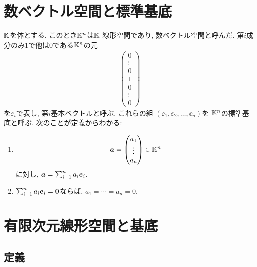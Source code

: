 \section{数ベクトル空間と標準基底}
$\mathbb{K}$を体とする.
このとき$\mathbb{K}^n$は$\mathbb{K}$-線形空間であり,
数ベクトル空間と呼んだ.
第$i$成分のみ$1$で他は$0$である$\mathbb{K}^n$の元
\begin{align*}
  \begin{pmatrix}0\\\vdots\\0\\1\\0\\\vdots\\0\end{pmatrix}
\end{align*}
を$\ee_i$で表し,
第$i$基本ベクトルと呼ぶ.
これらの組 $(\ee_1,\ee_2,\ldots,\ee_n)$を
$\mathbb{K}^n$の標準基底と呼ぶ.
次のことが定義からわかる:
\begin{enumerate}
\item
    \begin{align*}
      \boldsymbol{a}=\begin{pmatrix}a_1\\\vdots\\a_n\end{pmatrix}\in\mathbb{K}^n
    \end{align*}
    に対し, $\boldsymbol{a}=\sum_{i=1}^na_i\boldsymbol{e}_i$.
  \item
    $\sum_{i=1}^na_i\boldsymbol{e}_i=\boldsymbol{0}$ならば, $a_1=\cdots=a_n=0$.
\end{enumerate}
\section{有限次元線形空間と基底}
\subsection{定義}


